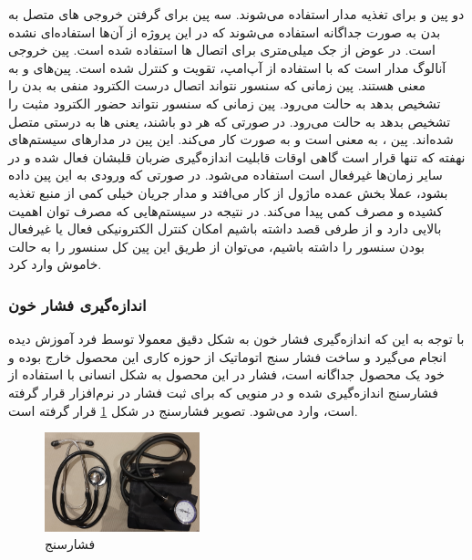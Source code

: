 دو پین  و  برای تغذیه مدار استفاده می‌شوند.  سه پین  برای گرفتن خروجی های متصل به بدن به صورت جداگانه استفاده می‌شوند که در این پروژه از آن‌ها استفاده‌ای نشده است. در عوض از جک  میلی‌متری برای اتصال ها استفاده شده است. پین  خروجی آنالوگ مدار است که با استفاده از آپ‌امپ، تقویت و کنترل شده است. پین‌های 
و
به معنی  هستند. پین  زمانی که سنسور نتواند اتصال درست الکترود منفی به بدن را تشخیص بدهد به حالت  می‌رود. پین  زمانی که سنسور نتواند حضور الکترود مثبت را تشخیص بدهد به حالت  می‌رود. در صورتی که هر دو  باشند، یعنی ها به درستی متصل شده‌اند.
پین ، به معنی  است و به صورت  کار می‌کند. این پین در مدارهای سیستم‌های نهفته که تنها قرار است گاهی اوقات قابلیت اندازه‌گیری ضربان قلبشان فعال شده و در سایر زمان‌ها غیرفعال است استفاده می‌شود. در صورتی که ورودی  به این پین داده بشود، عملا بخش عمده ماژول از کار می‌افتد و مدار جریان خیلی کمی از منبع تغذیه کشیده و مصرف کمی پیدا می‌کند. در نتیجه در سیستم‌هایی که مصرف توان اهمیت بالایی دارد و از طرفی قصد داشته باشیم امکان کنترل الکترونیکی فعال یا غیرفعال بودن سنسور را داشته باشیم، می‌توان از طریق این پین کل سنسور را به حالت خاموش وارد کرد.

\subsubsection{انداز‌ه‌گیری فشار خون }

با توجه به این که اندازه‌گیری فشار خون به شکل دقیق معمولا توسط فرد آموزش دیده انجام می‌گیرد و ساخت فشار سنج اتوماتیک از حوزه کاری این محصول خارج بوده و خود یک محصول جداگانه است، فشار در این محصول به شکل انسانی با استفاده از فشارسنج اندازه‌گیری شده و در منویی که برای ثبت فشار در نرم‌افزار قرار گرفته است، وارد می‌شود. تصویر فشارسنج در شکل \ref{fig:12} قرار گرفته است.



\begin{figure}[ht!]
	\centering
	\includegraphics[width=0.4\textwidth]{figs/cuff.jpg}
	
	\caption{فشارسنج}
	\label{fig:12}
\end{figure}

